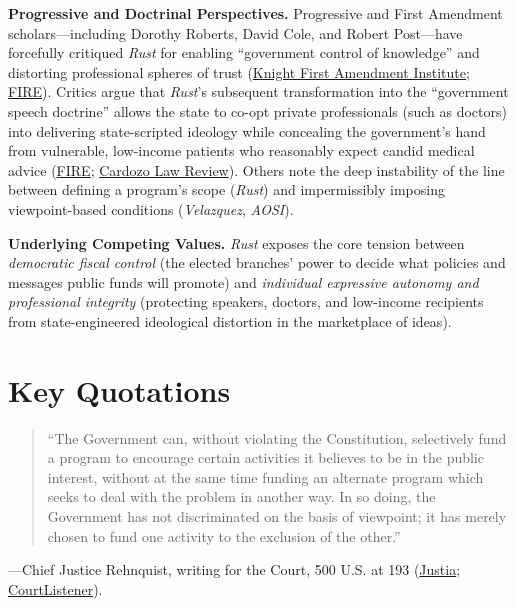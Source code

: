 \documentclass[12pt]{article}
\begin{document}
\textbf{Progressive and Doctrinal Perspectives.} Progressive and First Amendment scholars---including Dorothy Roberts, David Cole, and Robert Post---have forcefully critiqued \textit{Rust} for enabling ``government control of knowledge'' and distorting professional spheres of trust (\href{https://knightcolumbia.org/content/the-government-speech-doctrine-goes-to-school}{Knight First Amendment Institute}; \href{https://www.fire.org/news/harvard-law-review-note-tackles-complex-issue-distinguishing-government-versus-private-speech}{FIRE}). Critics argue that \textit{Rust}'s subsequent transformation into the ``government speech doctrine'' allows the state to co-opt private professionals (such as doctors) into delivering state-scripted ideology while concealing the government's hand from vulnerable, low-income patients who reasonably expect candid medical advice (\href{https://www.fire.org/research-learn/what-government-speech-doctrine}{FIRE}; \href{https://www.cardozolawreview.com/the-end-of-government-speech/}{Cardozo Law Review}). Others note the deep instability of the line between defining a program's scope (\textit{Rust}) and impermissibly imposing viewpoint-based conditions (\textit{Velazquez}, \textit{AOSI}).

\textbf{Underlying Competing Values.} \textit{Rust} exposes the core tension between \textit{democratic fiscal control} (the elected branches' power to decide what policies and messages public funds will promote) and \textit{individual expressive autonomy and professional integrity} (protecting speakers, doctors, and low-income recipients from state-engineered ideological distortion in the marketplace of ideas).

\section{Key Quotations}

\begin{quote}
``The Government can, without violating the Constitution, selectively fund a program to encourage certain activities it believes to be in the public interest, without at the same time funding an alternate program which seeks to deal with the problem in another way. In so doing, the Government has not discriminated on the basis of viewpoint; it has merely chosen to fund one activity to the exclusion of the other.''
\end{quote}
\noindent---Chief Justice Rehnquist, writing for the Court, 500 U.S. at 193 (\href{https://supreme.justia.com/cases/federal/us/500/173/}{Justia}; \href{https://www.courtlistener.com/opinion/112593/rust-v-sullivan/}{CourtListener}).
\end{document}
